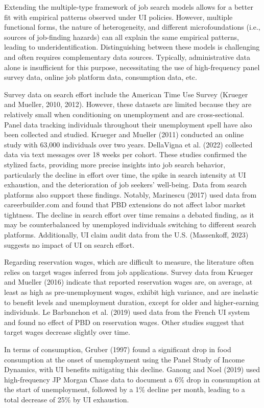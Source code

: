 \documentclass{article}
\begin{document}
Extending the multiple-type framework of job search models allows for a better fit with empirical patterns observed under UI policies. However, multiple functional forms, the nature of heterogeneity, and different microfoundations (i.e., sources of job-finding hazards) can all explain the same empirical patterns, leading to underidentification. Distinguishing between these models is challenging and often requires complementary data sources. Typically, administrative data alone is insufficient for this purpose, necessitating the use of high-frequency panel survey data, online job platform data, consumption data, etc.

Survey data on search effort include the American Time Use Survey (Krueger and Mueller, 2010, 2012). However, these datasets are limited because they are relatively small when conditioning on unemployment and are cross-sectional. Panel data tracking individuals throughout their unemployment spell have also been collected and studied. Krueger and Mueller (2011) conducted an online study with 63,000 individuals over two years. DellaVigna et al. (2022) collected data via text messages over 18 weeks per cohort. These studies confirmed the stylized facts, providing more precise insights into job search behavior, particularly the decline in effort over time, the spike in search intensity at UI exhaustion, and the deterioration of job seekers' well-being. Data from search platforms also support these findings. Notably, Marinescu (2017) used data from careerbuilder.com and found that PBD extensions do not affect labor market tightness. The decline in search effort over time remains a debated finding, as it may be counterbalanced by unemployed individuals switching to different search platforms. Additionally, UI claim audit data from the U.S. (Massenkoff, 2023) suggests no impact of UI on search effort.

Regarding reservation wages, which are difficult to measure, the literature often relies on target wages inferred from job applications. Survey data from Krueger and Mueller (2016) indicate that reported reservation wages are, on average, at least as high as pre-unemployment wages, exhibit high variance, and are inelastic to benefit levels and unemployment duration, except for older and higher-earning individuals. Le Barbanchon et al. (2019) used data from the French UI system and found no effect of PBD on reservation wages. Other studies suggest that target wages decrease slightly over time.

In terms of consumption, Gruber (1997) found a significant drop in food consumption at the onset of unemployment using the Panel Study of Income Dynamics, with UI benefits mitigating this decline. Ganong and Noel (2019) used high-frequency JP Morgan Chase data to document a 6\% drop in consumption at the start of unemployment, followed by a 1\% decline per month, leading to a total decrease of 25\% by UI exhaustion.
\end{document}
